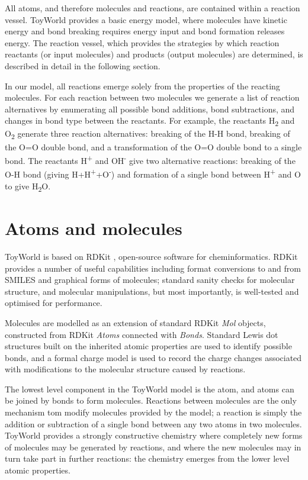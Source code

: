 All atoms, and therefore molecules and reactions, are contained within a
reaction vessel. ToyWorld provides a basic energy model, where molecules
have kinetic energy and bond breaking requires energy input and bond
formation releases energy. The reaction vessel, which provides the
strategies by which reaction reactants (or input molecules) and products
(output molecules) are determined, is described in detail in the
following section.

In our model, all reactions emerge solely from the properties of the
reacting molecules. For each reaction between two molecules we generate
a list of reaction alternatives by enumerating all possible bond
additions, bond subtractions, and changes in bond type between the
reactants. For example, the reactants H\textsubscript{2} and
O\textsubscript{2} generate three reaction alternatives: breaking of the
H-H bond, breaking of the O=O double bond, and a transformation of the
O=O double bond to a single bond. The reactants H\textsuperscript{+} and
OH\textsuperscript{-} give two alternative reactions: breaking of the
O-H bond (giving H+H\textsuperscript{+}+O\textsuperscript{-}) and
formation of a single bond between H\textsuperscript{+} and O to give
H\textsubscript{2}O.

\section{Atoms and molecules}\label{atoms-and-molecules}

ToyWorld is based on RDKit \autocite{rdkit}, open-source software for
cheminformatics. RDKit provides a number of useful capabilities
including format conversions to and from SMILES \autocite{smiles} and
graphical forms of molecules; standard sanity checks for molecular
structure, and molecular manipulations, but most importantly, is
well-tested and optimised for performance.

Molecules are modelled as an extension of standard RDKit \emph{Mol}
objects, constructed from RDKit \emph{Atoms} connected with
\emph{Bonds}. Standard Lewis dot structures built on the inherited
atomic properties are used to identify possible bonds, and a formal
charge model is used to record the charge changes associated with
modifications to the molecular structure caused by reactions.

The lowest level component in the ToyWorld model is the atom, and atoms
can be joined by bonds to form molecules. Reactions between molecules
are the only mechanism tom modify molecules provided by the model; a
reaction is simply the addition or subtraction of a single bond between
any two atoms in two molecules. ToyWorld provides a strongly
constructive chemistry \autocite{Fontana1994} where completely new forms
of molecules may be generated by reactions, and where the new molecules
may in turn take part in further reactions: the chemistry emerges from
the lower level atomic properties.

